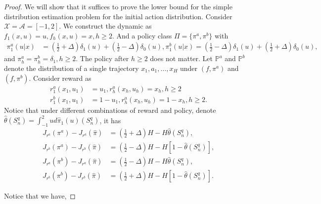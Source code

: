 \documentclass{article}
\begin{document}
\begin{proof}
    We will show that it suffices to prove the lower bound for the simple distribution estimation problem for the initial action distribution. Consider $\mathcal X = \mathcal A = [-1,2]$. We construct the dynamic as $f_1(x,u) = u, f_h(x,u) = x, h\geq 2$. And a policy class $\Pi=\{\pi^a, \pi^b\}$ with 
\begin{align*}
    \pi^a_1(u|x)&=(\frac{1}{2}+\Delta)\delta_{1}(u)+(\frac{1}{2}-\Delta)\delta_{0}(u), \pi_1^b(u|x) = (\frac{1}{2}-\Delta)\delta_{1}(u)+(\frac{1}{2}+\Delta)\delta_{0}(u),
\end{align*}
and $\pi^a_h=\pi^b_h=\delta_1, h\geq 2$. The policy after $h\geq 2$ does not matter. Let $\mathbb P^a$ and $\mathbb P^b$ denote the distribution of a single trajectory $x_1,a_1,\ldots, x_H$ under $(f,\pi^a)$ and $(f,\pi^b)$. Consider reward as 
\begin{align*}
    r^a_1(x_1,u_1) &= u_1, r^a_h(x_h, u_h)=x_h,h\geq 2\\
    r^b_1(x_1,u_1) &= 1-u_1, r^a_h(x_h, u_h)=1-x_h,h\geq 2.
\end{align*}
Notice that under different combinations of reward and policy, denote $\hat \theta(S_n^q) = \int_{-1}^2ud\hat\pi_1(u)(S_n^q)$, it has
\begin{align*}
    J_{r^a}(\pi^a) - J_{r^a}(\hat \pi) &= (\frac{1}{2}+\Delta)H-H\hat \theta(S_n^q),\\
    J_{r^b}(\pi^a)-J_{r^b}(\hat \pi) &= (\frac{1}{2}-\Delta)H-H[1-\hat \theta(S_n^q)],\\
    J_{r^a}(\pi^b)-J_{r^a}(\hat \pi)&= (\frac{1}{2}-\Delta)H- H\hat \theta(S_n^q),\\
    J_{r^b}(\pi^b)-J_{r^b}(\hat \pi)&= (\frac{1}{2}+\Delta)H-H[1-\hat \theta(S_n^q)].
\end{align*}

Notice that we have,


\end{proof}
\end{document}
